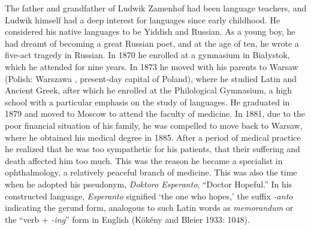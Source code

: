 The father and grandfather of Ludwik Zamenhof had been language teachers, and Ludwik himself had a deep interest for languages since early childhood.
He considered his native languages to be Yiddish and Russian.
As a young boy, he had dreamt of becoming a great Russian poet, and at the age of ten, he wrote a five-act tragedy in Russian.
In 1870 he enrolled at a gymnasium in Białystok, which he attended for nine years.
In 1873 he moved with his parents to Warsaw (Polish: Warszawa \ipa{[varˈʂava]}, present-day capital of Poland), where he studied Latin and Ancient Greek, after which he enrolled at the Philological Gymnasium, a high school with a particular emphasis on the study of languages.
He graduated in 1879 and moved to Moscow to attend the faculty of medicine.
In 1881, due to the poor financial situation of his family, he was compelled to move back to Warsaw, where he obtained his medical degree in 1885.
After a period of medical practice he realized that he was too sympathetic for his patients, that their suffering and death affected him too much.
This was the reason he became a specialist in ophthalmology, a relatively peaceful branch of medicine.
This was also the time when he adopted his pseudonym, \textit{Doktoro Esperanto}, ``Doctor Hopeful.''
In his constructed language, \textit{Esperanto} signified `the one who hopes,'
the suffix \textit{-anto} indicating the gerund form, analogous to such Latin words as \textit{memorandum} or the ``verb + \textit{-ing}'' form in English
(Kökény and Bleier 1933: 1048).

